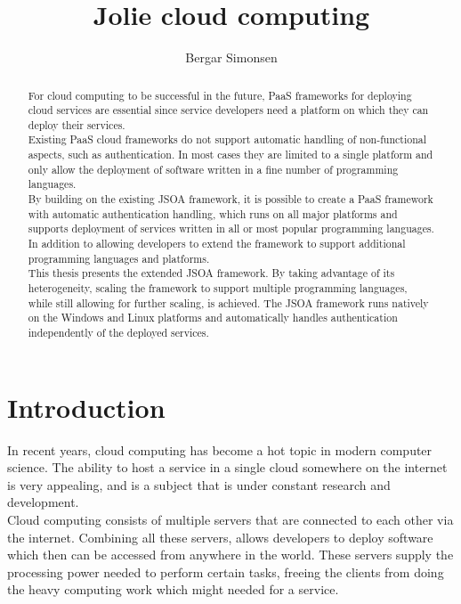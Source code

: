 \documentclass[12pt,a4paper]{article}
\author{Bergar Simonsen}
\title{Jolie cloud computing}
\begin{document}
\pagestyle{empty}
\begin{abstract}
For cloud computing to be successful in the future, PaaS frameworks for deploying cloud services are essential since service developers need a platform on which they can deploy their services.\\
Existing PaaS cloud frameworks do not support automatic handling of non-functional aspects, such as authentication. In most cases they are limited to a single platform and only allow the deployment of software written in a fine number of programming languages.\\
By building on the existing JSOA framework, it is possible to create a PaaS framework with automatic authentication handling, which runs on all major platforms and supports deployment of services written in all or most popular programming languages. In addition to allowing developers to extend the framework to support additional programming languages and platforms.\\
This thesis presents the extended JSOA framework. By taking advantage of its heterogeneity, scaling the framework to support multiple programming languages, while still allowing for further scaling, is achieved. The JSOA framework runs natively on the Windows and Linux platforms and automatically handles authentication independently of the deployed services.

\end{abstract}

\tableofcontents

\pagestyle{plain}
\newpage
\section{Introduction}\label{sec:Introduction}
In recent years, cloud computing has become a hot topic in modern computer science. The ability to host a service in a single cloud somewhere on the internet is very appealing, and is a subject that is under constant research and development.\\
Cloud computing consists of multiple servers that are connected to each other via the internet. Combining all these servers, allows developers to deploy software which then can be accessed from anywhere in the world. These servers supply the processing power needed to perform certain tasks, freeing the clients from doing the heavy computing work which might needed for a service. \\
\end{document}
